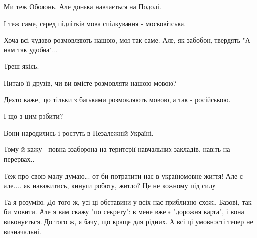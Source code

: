 \begin{itemize}
\begin{itemize}
Ми теж Оболонь. Але донька навчається на Подолі.

І теж саме, серед підлітків мова спілкування - московітська.

Хоча всі чудово розмовляють нашою, моя так саме. Але, як забобон, твердять "А
нам так удобна"...

Треш якісь.

Питаю її друзів, чи ви вмієте розмовляти нашою мовою?

Дехто каже, що тільки з батьками розмовляють мовою, а так - російською.

І що з цим робити?

Вони народились і ростуть в Незалежній Україні.

 
Тому й кажу - повна ззаборона на території навчальних закладів, навіть на перервах..

\end{itemize}

 

Теж про свою малу думаю... от би потрапити нас в україномовне життя! Але є але....
як наважитись, кинути роботу, житло? Це не кожному під силу 🤔

\begin{itemize}
 

Та я розумію. До того ж, усі ці обставини у всіх нас приблизно схожі. Базові,
так би мовити. Але я вам скажу "по секрету": в мене вже є "дорожня карта", і
вона виконується. До того ж, я бачу, що краще для рідних. А всі ці умовності
тепер не визначальні.


 

\end{itemize}
\end{itemize}
